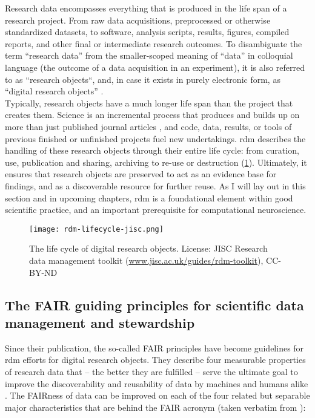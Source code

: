 Research data encompasses everything that is produced in the life span of a research project.
From raw data acquisitions, preprocessed or otherwise standardized datasets, to software, analysis scripts, results, figures, compiled reports, and other final or intermediate research outcomes.
To disambiguate the term ``research data'' from the smaller-scoped meaning of ``data'' in colloquial language (the outcome of a data acquisition in an experiment), it is also referred to as ``research objects``, and, in case it exists in purely electronic form, as ``digital research objects'' \citep{bechhofer2010research}. \\
Typically, research objects have a much longer life span than the project that creates them.
Science is an incremental process that produces and builds up on more than just published journal articles \citep{mons2018data}, and code, data, results, or tools of previous finished or unfinished projects fuel new undertakings.
\gls{rdm} describes the handling of these research objects through their entire life cycle: from curation, use, publication and sharing, archiving to re-use or destruction (\cref{fig:rdm-lifecycle}).
Ultimately, it ensures that research objects are preserved to act as an evidence base for findings, and as a discoverable resource for further reuse.
As I will lay out in this section and in upcoming chapters, \gls{rdm} is a foundational element within good scientific practice, and an important prerequisite for computational neuroscience.


\begin{figure}
	\centering
	\texttt{[image: rdm-lifecycle-jisc.png]}
	\caption[The life cycle of digital research objects]{The life cycle of digital research objects. License: JISC Research data management toolkit (\href{https://www.jisc.ac.uk/guides/rdm-toolkit}{www.jisc.ac.uk/guides/rdm-toolkit}), CC-BY-ND}
	\label{fig:rdm-lifecycle}
\end{figure}


\subsection{The FAIR guiding principles for scientific data management and stewardship}

Since their publication, the so-called \gls{FAIR} principles \citep{wilkinson2016fair} have become guidelines for \gls{rdm} efforts for digital research objects.
They describe four measurable properties of research data that -- the better they are fulfilled -- serve the ultimate goal to improve the discoverability and reusability of data by machines and humans alike \citep{wilkinson2016fair}.
The \gls{FAIR}ness of data can be improved on each of the four related but separable major characteristics that are behind the \gls{FAIR} acronym (taken verbatim from \citet{wilkinson2016fair}):

